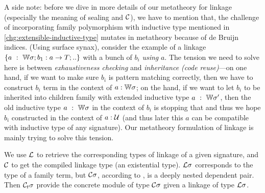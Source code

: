 A side note: before we dive in more details of our metatheory for linkage (especially the meaning of sealing and ${\mathcal{C}}$), we have to mention that, the challenge of incorporating family polymorphism with inductive type mentioned in \ref{chg:extensible-inductive-type} mutates in metatheory because of de Bruijn indices. (Using surface synax), consider the example of a linkage $\{a~:~{\mathbb{W}} \sigma; b_1 : a \to T;..\}$ with a bunch of $b_i$ \textit{using} $a$. The tension we need to solve here is between \textit{exhaustiveness checking} and \textit{inheritance (code reuse)}---on one hand, if we want to make sure $b_i$ is pattern matching correctly, then we have to construct $b_i$ term in the context of $a : {\mathbb{W}}\sigma$; on the hand, if we want to let $b_i$ to be inherited into children family with extended inductive type $a~:~{\mathbb{W}} \sigma'$, then the old inductive type $a~:~{\mathbb{W}} \sigma$ in the context of $b_i$ is stopping that and thus we hope $b_i$ constructed in the context of $a : {\mathcal{U}}$ (and thus later this $a$ can be compatible with inductive type of any signature). Our metatheory formulation of linkage is mainly trying to solve this tension.



We use ${\mathcal{L}}$ to retrieve the corresponding types of linkage of a given signature, and ${\mathcal{C}}$ to get the compiled linkage type (an existential type).
${\mathcal{L}}\sigma$ corresponds to the type of a family term, but ${\mathcal{C}}\sigma$, according to , is a deeply nested dependent pair. Then ${\mathcal{C}_t} \sigma$ provide the concrete module of type ${\mathcal{C}}\sigma$ given a linkage of type ${\mathcal{L}}\sigma$. 

